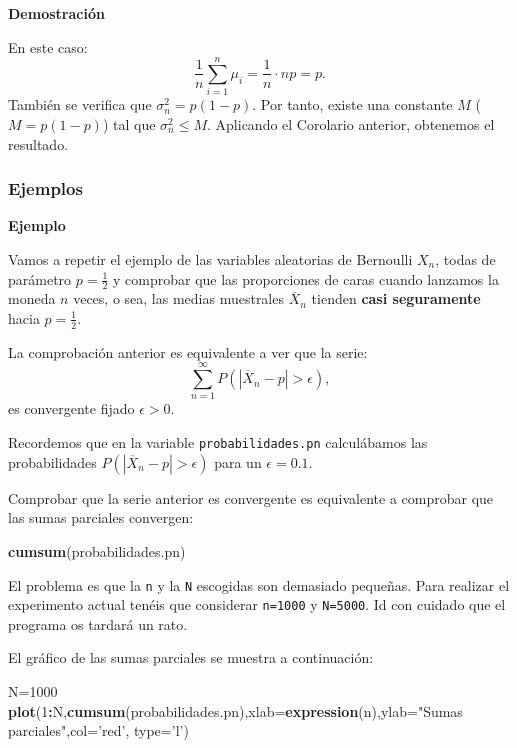 \documentclass[]{book}
\newenvironment{Shaded}{\begin{snugshade}}{\end{snugshade}}
\newcommand{\DataTypeTok}[1]{\textcolor[rgb]{0.13,0.29,0.53}{#1}}
\newcommand{\DecValTok}[1]{\textcolor[rgb]{0.00,0.00,0.81}{#1}}
\newcommand{\KeywordTok}[1]{\textcolor[rgb]{0.13,0.29,0.53}{\textbf{#1}}}
\newcommand{\NormalTok}[1]{#1}
\newcommand{\OperatorTok}[1]{\textcolor[rgb]{0.81,0.36,0.00}{\textbf{#1}}}
\newcommand{\StringTok}[1]{\textcolor[rgb]{0.31,0.60,0.02}{#1}}
\begin{document}
\textbf{Demostración}

En este caso:
\[
\frac{1}{n}\sum_{i=1}^n \mu_i = \frac{1}{n}\cdot np=p.
\]
También se verifica que \(\sigma_n^2 =p(1-p)\). Por tanto, existe una constante \(M\) (\(M=p(1-p)\)) tal que \(\sigma_n^2\leq M\). Aplicando el Corolario anterior, obtenemos el resultado.

\hypertarget{ejemplos-24}{%
\subsubsection{Ejemplos}\label{ejemplos-24}}

\textbf{Ejemplo}

Vamos a repetir el ejemplo de las variables aleatorias de Bernoulli \(X_n\), todas de parámetro \(p=\frac{1}{2}\) y comprobar que las proporciones de caras cuando lanzamos la moneda \(n\) veces, o sea, las medias muestrales \(\overline{X}_n\) tienden \textbf{casi seguramente} hacia \(p=\frac{1}{2}\).

La comprobación anterior es equivalente a ver que la serie:
\[
\sum_{n=1}^\infty P(|\overline{X}_n-p|>\epsilon),
\]
es convergente fijado \(\epsilon >0\).

Recordemos que en la variable \texttt{probabilidades.pn} calculábamos las probabilidades \(P(|\overline{X}_n-p|>\epsilon)\) para un \(\epsilon =0.1\).

Comprobar que la serie anterior es convergente es equivalente a comprobar que las sumas parciales convergen:

\begin{Shaded}
\begin{Highlighting}[]
\KeywordTok{cumsum}\NormalTok{(probabilidades.pn)}
\end{Highlighting}
\end{Shaded}

El problema es que la \texttt{n} y la \texttt{N} escogidas son demasiado pequeñas. Para realizar el experimento actual tenéis que considerar \texttt{n=1000} y \texttt{N=5000}. Id con cuidado que el programa os tardará un rato.

El gráfico de las sumas parciales se muestra a continuación:

\begin{Shaded}
\begin{Highlighting}[]
\NormalTok{N=}\DecValTok{1000}
\KeywordTok{plot}\NormalTok{(}\DecValTok{1}\OperatorTok{:}\NormalTok{N,}\KeywordTok{cumsum}\NormalTok{(probabilidades.pn),}\DataTypeTok{xlab=}\KeywordTok{expression}\NormalTok{(n),}\DataTypeTok{ylab=}\StringTok{"Sumas parciales"}\NormalTok{,}\DataTypeTok{col=}\StringTok{'red'}\NormalTok{, }\DataTypeTok{type=}\StringTok{'l'}\NormalTok{)}
\end{Highlighting}
\end{Shaded}
\end{document}
